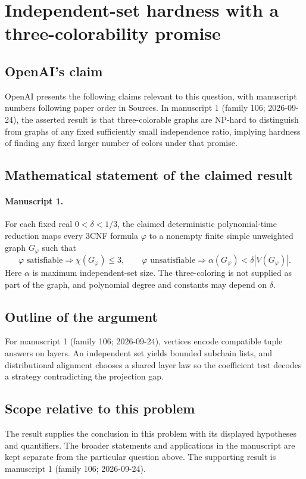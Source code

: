 \documentclass[11pt]{article}
\begin{document}
\section*{Independent-set hardness with a three-colorability promise}

\subsection{OpenAI's claim}
OpenAI presents the following claims relevant to this question, with manuscript numbers following paper order in Sources. In manuscript 1 (family 106; 2026-09-24), the asserted result is that three-colorable graphs are NP-hard to distinguish from graphs of any fixed sufficiently small independence ratio, implying hardness of finding any fixed larger number of colors under that promise.

\subsection{Mathematical statement of the claimed result}
\paragraph{Manuscript 1.}
For each fixed real $0<\delta<1/3$, the claimed deterministic polynomial-time reduction maps every $3$CNF formula $\varphi$ to a nonempty finite simple unweighted graph $G_{\varphi}$ such that
\[
 \varphi\text{ satisfiable}\Rightarrow\chi(G_{\varphi})\le3,
 \qquad\varphi\text{ unsatisfiable}\Rightarrow\alpha(G_{\varphi})<\delta|V(G_{\varphi})|.
\]
Here $\alpha$ is maximum independent-set size. The three-coloring is not supplied as part of the graph, and polynomial degree and constants may depend on $\delta$.

\subsection{Outline of the argument}
For manuscript 1 (family 106; 2026-09-24), vertices encode compatible tuple answers on layers. An independent set yields bounded subchain lists, and distributional alignment chooses a shared layer law so the coefficient test decodes a strategy contradicting the projection gap.

\subsection{Scope relative to this problem}
The result supplies the conclusion in this problem with its displayed hypotheses and quantifiers. The broader statements and applications in the manuscript are kept separate from the particular question above. The supporting result is manuscript 1 (family 106; 2026-09-24).
\end{document}
